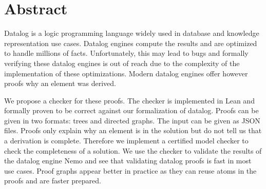 \chapter*{Abstract}
    Datalog is a logic programming language widely used in database and knowledge representation use cases. Datalog engines compute the results and are optimized to handle millions of facts. Unfortunately, this may lead to bugs and formally verifying these datalog engines is out of reach due to the complexity of the implementation of these optimizations. Modern datalog engines offer however proofs why an element was derived.

    We propose a checker for these proofs. The checker is implemented in Lean and formally proven to be correct against our formalization of datalog. Proofs can be given in two formats: trees and directed graphs. The input can be given as JSON files. Proofs only explain why an element is in the solution but do not tell us that a derivation is complete. Therefore we implement a certified model checker to check the completeness of a solution. We use the checker to validate the results of the datalog engine Nemo and see that validating datalog proofs is fast in most use cases. Proof graphs appear better in practice as they can reuse atoms in the proofs and are faster prepared.
